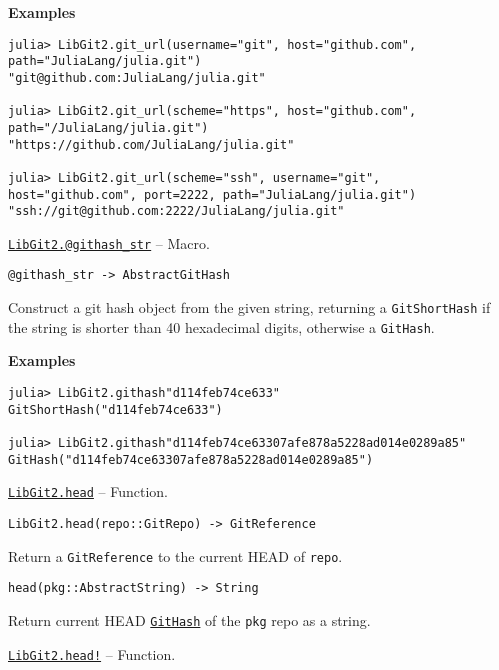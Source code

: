 \begin{adjustwidth}{2em}{0pt}
\begin{quote}
\end{quote}
\textbf{Examples}


\begin{verbatim}
julia> LibGit2.git_url(username="git", host="github.com", path="JuliaLang/julia.git")
"git@github.com:JuliaLang/julia.git"

julia> LibGit2.git_url(scheme="https", host="github.com", path="/JuliaLang/julia.git")
"https://github.com/JuliaLang/julia.git"

julia> LibGit2.git_url(scheme="ssh", username="git", host="github.com", port=2222, path="JuliaLang/julia.git")
"ssh://git@github.com:2222/JuliaLang/julia.git"
\end{verbatim}



\end{adjustwidth}
\hypertarget{6260170502036665222}{} 
\hyperlink{6260170502036665222}{\texttt{LibGit2.@githash\_str}}  -- {Macro.}

\begin{adjustwidth}{2em}{0pt}


\begin{verbatim}
@githash_str -> AbstractGitHash
\end{verbatim}

Construct a git hash object from the given string, returning a \texttt{GitShortHash} if the string is shorter than 40 hexadecimal digits, otherwise a \texttt{GitHash}.

\textbf{Examples}


\begin{verbatim}
julia> LibGit2.githash"d114feb74ce633"
GitShortHash("d114feb74ce633")

julia> LibGit2.githash"d114feb74ce63307afe878a5228ad014e0289a85"
GitHash("d114feb74ce63307afe878a5228ad014e0289a85")
\end{verbatim}



\end{adjustwidth}
\hypertarget{14955163669937294027}{} 
\hyperlink{14955163669937294027}{\texttt{LibGit2.head}}  -- {Function.}

\begin{adjustwidth}{2em}{0pt}


\begin{verbatim}
LibGit2.head(repo::GitRepo) -> GitReference
\end{verbatim}

Return a \texttt{GitReference} to the current HEAD of \texttt{repo}.




\begin{lstlisting}
head(pkg::AbstractString) -> String
\end{lstlisting}

Return current HEAD \hyperlink{202290709580230708}{\texttt{GitHash}} of the \texttt{pkg} repo as a string.



\end{adjustwidth}
\hypertarget{16482865322979618348}{} 
\hyperlink{16482865322979618348}{\texttt{LibGit2.head!}}  -- {Function.}

